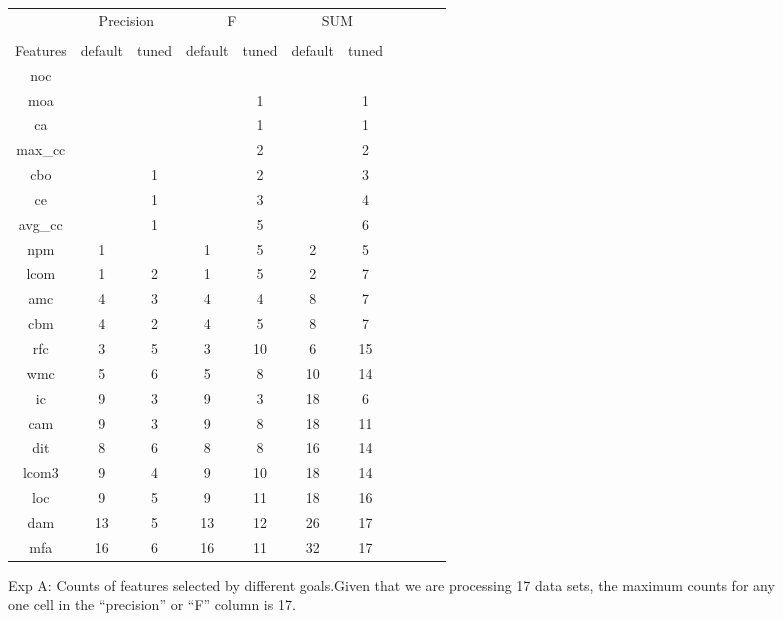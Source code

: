 \documentclass{acm_proc_article-sp}
\begin{document}
\begin{figure}[!t]

\renewcommand{\baselinestretch}{0.8}
\scriptsize
\centering
  \begin{tabular}{c|c c|c c|c c|c c| c c }
  
    &   \multicolumn{2}{c|}{Precision} & \multicolumn{2}{c|}{F} &  \multicolumn{2}{c|}{SUM}\\
 &&&&&&&\\
Features&   
  default
& tuned
& default
& tuned
& default
& tuned
\\\hline
 
noc& & & & & & \\
moa& & & & 1& & 1\\
ca& & & & 1& & 1\\
max\_cc& & & & 2& & 2\\
cbo& & 1& & 2& & 3\\
ce& & 1& & 3& & 4\\
avg\_cc& & 1& & 5& & 6\\
npm& 1& & 1& 5& 2 & 5\\
lcom& 1& 2& 1& 5& 2& 7\\
amc& 4& 3& 4& 4& 8& 7\\
cbm& 4& 2& 4& 5&8 & 7\\
rfc& 3& 5& 3& 10& 6& 15\\
wmc& 5& 6& 5& 8& 10& 14\\
ic& 9& 3& 9& 3& 18& 6\\
cam& 9& 3& 9& 8& 18& 11\\
dit& 8& 6& 8& 8& 16& 14\\
lcom3& 9& 4& 9& 10& 18& 14\\
loc& 9& 5& 9& 11& 18& 16\\
dam& 13& 5& 13& 12&26 & 17\\
mfa& 16& 6& 16& 11& 32& 17\\
  \end{tabular}
    \caption{ Exp A: Counts of features selected by different goals.Given that we are processing 17 data sets, the maximum counts for any 
one cell in the ``precision'' or ``F'' column is 17.  
    }\label{fig:counts}
\end{figure}
\end{document}
